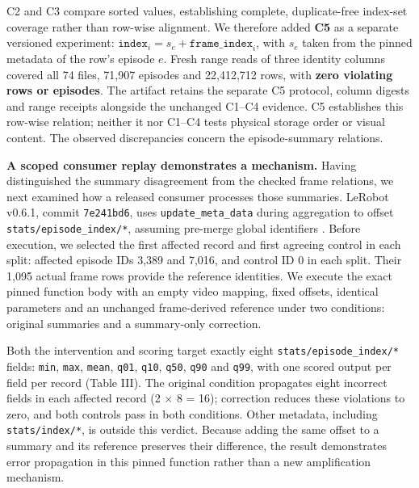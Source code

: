\documentclass[conference]{IEEEtran}
\begin{document}
C2 and C3 compare sorted values, establishing complete, duplicate-free index-set coverage rather than row-wise alignment. We therefore added \textbf{C5} as a separate versioned experiment: \(\texttt{index}_i = s_e + \texttt{frame\_index}_i\), with \(s_e\) taken from the pinned metadata of the row's episode \(e\). Fresh range reads of three identity columns covered all 74 files, 71,907 episodes and 22,412,712 rows, with \textbf{zero violating rows or episodes}. The artifact retains the separate C5 protocol, column digests and range receipts alongside the unchanged C1--C4 evidence. C5 establishes this row-wise relation; neither it nor C1--C4 tests physical storage order or visual content. The observed discrepancies concern the episode-summary relations.\par

\textbf{A scoped consumer replay demonstrates a mechanism.} Having distinguished the summary disagreement from the checked frame relations, we next examined how a released consumer processes those summaries. LeRobot v0.6.1, commit \texttt{7e241bd6}, uses \texttt{update\_\allowbreak{}\allowbreak{}meta\_\allowbreak{}\allowbreak{}data} during aggregation to offset \texttt{stats/\allowbreak{}episode\_\allowbreak{}\allowbreak{}index/\allowbreak{}*}, assuming pre-merge global identifiers \cite{29}. Before execution, we selected the first affected record and first agreeing control in each split: affected episode IDs 3,389 and 7,016, and control ID 0 in each split. Their 1,095 actual frame rows provide the reference identities. We execute the exact pinned function body with an empty video mapping, fixed offsets, identical parameters and an unchanged frame-derived reference under two conditions: original summaries and a summary-only correction.\par



Both the intervention and scoring target exactly eight \texttt{stats/\allowbreak{}episode\_\allowbreak{}\allowbreak{}index/\allowbreak{}*} fields: \texttt{min}, \texttt{max}, \texttt{mean}, \texttt{q01}, \texttt{q10}, \texttt{q50}, \texttt{q90} and \texttt{q99}, with one scored output per field per record (Table III). The original condition propagates eight incorrect fields in each affected record (2 × 8 = 16); correction reduces these violations to zero, and both controls pass in both conditions. Other metadata, including \texttt{stats/\allowbreak{}index/\allowbreak{}*}, is outside this verdict. Because adding the same offset to a summary and its reference preserves their difference, the result demonstrates error propagation in this pinned function rather than a new amplification mechanism.\par
\end{document}
